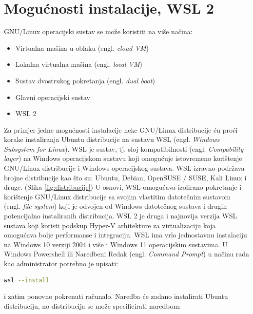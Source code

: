 \documentclass{foi}
\begin{document}
\section{Mogućnosti instalacije, WSL 2}
GNU/Linux operacijski sustav se može koristiti na više načina\cite{MS_howto}:
\begin{itemize}
    \item Virtualna mašina u oblaku (engl. \textit{cloud VM})
    \item Lokalna virtualna mašina (engl. \textit{local VM})
    \item Sustav dvostrukog pokretanja (engl. \textit{dual boot})
    \item Glavni operacijski sustav
    \item WSL 2
\end{itemize}
Za primjer jedne mogućnosti instalacije neke GNU/Linux distribucije ću proći korake instaliranja Ubuntu distribucije na sustavu WSL (engl. \textit{Windows Subsystem for Linux}). WSL je sustav, tj. sloj kompatibilnosti (engl. \textit{Compability layer}) na Windows operacijskom sustavu koji omogućuje istovremeno korištenje GNU/Linux distribucije i Windows operacijskog sustava.\cite{MS_whatis_wsl} WSL izravno podržava brojne distribucije kao što su: Ubuntu, Debian, OpenSUSE / SUSE, Kali Linux i druge. (Slika \ref{fig:distribucije}) U osnovi, WSL omogućava izolirano pokretanje i korištenje GNU/Linux distribucije sa svojim vlastitim datotečnim sustavom (engl. \textit{file system}) koji je odvojen od Windows datotečnog sustava i drugih potencijalno instaliranih distribucija. WSL 2 je druga i najnovija verzija WSL sustava koji koristi podskup Hyper-V arhitekture za virtualizaciju koja omogućava bolje performanse i integraciju.\cite{hyperv}
WSL ima vrlo jednostavnu instalaciju na Windows 10 verziji 2004 i više i Windows 11 operacijskim sustavima\cite{MS_install_wsl}. U Windows Powershell ili Naredbeni Redak (engl. \textit{Command Prompt}) u načinu rada kao administrator potrebno je upisati:


\begin{lstlisting}[language=bash]
wsl --install
\end{lstlisting}

\begin{flushleft}i zatim ponovno pokrenuti računalo. Naredba će zadano instalirati Ubuntu distribuciju, no distribucija se može specificirati naredbom:\end{flushleft}
\end{document}
